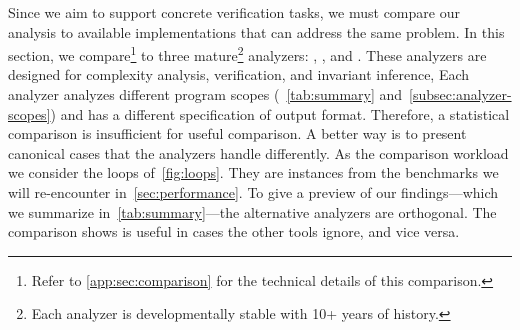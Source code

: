 Since we aim to support concrete verification tasks, we must compare our analysis to available implementations that can address the same problem.
In this section, we compare\footnote{Refer to \autoref{app:sec:comparison} for the technical details of this comparison.}
\ndx{\impl} to three mature\footnote{Each analyzer is developmentally stable with 10+ years of history.} analyzers: , , and .
These analyzers are designed for complexity analysis, verification, and invariant inference, \resp
Each analyzer analyzes different program scopes (\cf~\autoref{tab:summary} and~\autoref{subsec:analyzer-scopes}) and has a different specification of output format.
Therefore, a statistical comparison is insufficient for useful comparison.
A better way is to present canonical cases that the analyzers handle differently.
As the comparison workload we consider the loops of~\autoref{fig:loops}.
They are instances from the benchmarks we will re-encounter in~\autoref{sec:performance}.
To give a preview of our findings---which we summarize in~\autoref{tab:summary}---the alternative analyzers are {orthogonal}.
The comparison shows \ndx{\impl} is useful in cases the other tools ignore, and vice versa.

